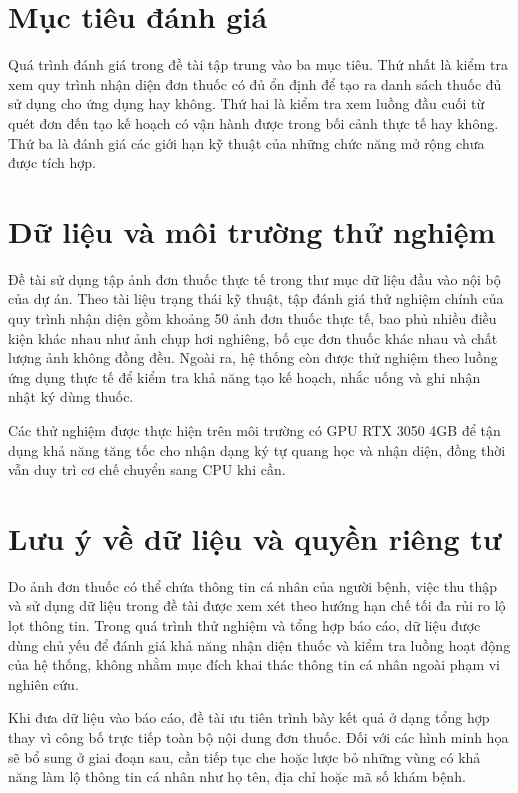 \documentclass[12pt,a4paper]{report}
\begin{document}
\section{Mục tiêu đánh giá}

Quá trình đánh giá trong đề tài tập trung vào ba mục tiêu. Thứ nhất là kiểm tra xem quy trình nhận diện đơn thuốc có đủ ổn định để tạo ra danh sách thuốc đủ sử dụng cho ứng dụng hay không. Thứ hai là kiểm tra xem luồng đầu cuối từ quét đơn đến tạo kế hoạch có vận hành được trong bối cảnh thực tế hay không. Thứ ba là đánh giá các giới hạn kỹ thuật của những chức năng mở rộng chưa được tích hợp.

\section{Dữ liệu và môi trường thử nghiệm}

Đề tài sử dụng tập ảnh đơn thuốc thực tế trong thư mục dữ liệu đầu vào nội bộ của dự án. Theo tài liệu trạng thái kỹ thuật, tập đánh giá thử nghiệm chính của quy trình nhận diện gồm khoảng 50 ảnh đơn thuốc thực tế, bao phủ nhiều điều kiện khác nhau như ảnh chụp hơi nghiêng, bố cục đơn thuốc khác nhau và chất lượng ảnh không đồng đều. Ngoài ra, hệ thống còn được thử nghiệm theo luồng ứng dụng thực tế để kiểm tra khả năng tạo kế hoạch, nhắc uống và ghi nhận nhật ký dùng thuốc.

Các thử nghiệm được thực hiện trên môi trường có GPU RTX 3050 4GB để tận dụng khả năng tăng tốc cho nhận dạng ký tự quang học và nhận diện, đồng thời vẫn duy trì cơ chế chuyển sang CPU khi cần.

\section{Lưu ý về dữ liệu và quyền riêng tư}

Do ảnh đơn thuốc có thể chứa thông tin cá nhân của người bệnh, việc thu thập và sử dụng dữ liệu trong đề tài được xem xét theo hướng hạn chế tối đa rủi ro lộ lọt thông tin. Trong quá trình thử nghiệm và tổng hợp báo cáo, dữ liệu được dùng chủ yếu để đánh giá khả năng nhận diện thuốc và kiểm tra luồng hoạt động của hệ thống, không nhằm mục đích khai thác thông tin cá nhân ngoài phạm vi nghiên cứu.

Khi đưa dữ liệu vào báo cáo, đề tài ưu tiên trình bày kết quả ở dạng tổng hợp thay vì công bố trực tiếp toàn bộ nội dung đơn thuốc. Đối với các hình minh họa sẽ bổ sung ở giai đoạn sau, cần tiếp tục che hoặc lược bỏ những vùng có khả năng làm lộ thông tin cá nhân như họ tên, địa chỉ hoặc mã số khám bệnh.
\end{document}
